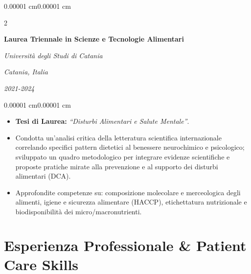 \documentclass[10pt, letterpaper]{article}
\newenvironment{highlights}{
    \begin{itemize}[
        topsep=0.06 cm,
        parsep=0.04 cm,
        partopsep=0pt,
        itemsep=0pt,
        leftmargin=0.4 cm + 10pt
    ]
}{
    \end{itemize}
}
\newenvironment{onecolentry}{
    \begin{adjustwidth}{0.00001 cm}{0.00001 cm}
}{
    \end{adjustwidth}
}
\newenvironment{twocolentry}[2][]{
    \onecolentry
    \def\secondColumn{#2}
    \setcolumnwidth{\fill, 6.0 cm}
    \begin{paracol}{2}
}{
    \switchcolumn \raggedleft \secondColumn
    \end{paracol}
    \endonecolentry
}
\begin{document}
        \vspace{0.25 cm}

        \begin{twocolentry}{
            \textit{Catania, Italia}\vspace{0 cm}
            
            \textit{2021-2024}
        }
            \textbf{Laurea Triennale in Scienze e Tecnologie Alimentari}\vspace{0 cm}
            
            \textit{Università degli Studi di Catania}
        \end{twocolentry}
        \vspace{0.1 cm}
        \begin{onecolentry}
            \begin{highlights}
                \item \textbf{Tesi di Laurea:} \textit{``Disturbi Alimentari e Salute Mentale''}.
                \item Condotta un'analisi critica della letteratura scientifica internazionale correlando specifici pattern dietetici al benessere neurochimico e psicologico; sviluppato un quadro metodologico per integrare evidenze scientifiche e proposte pratiche mirate alla prevenzione e al supporto dei disturbi alimentari (DCA).
                \item Approfondite competenze su: composizione molecolare e merceologica degli alimenti, igiene e sicurezza alimentare (HACCP), etichettatura nutrizionale e biodisponibilità dei micro/macronutrienti.
            \end{highlights}
        \end{onecolentry}

    \vspace{0.1 cm}

    \section{Esperienza Professionale \& Patient Care Skills}
\end{document}
